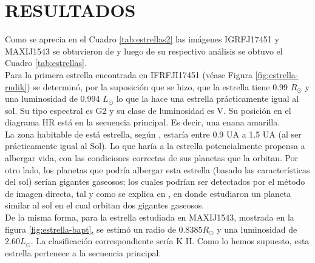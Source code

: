 \section*{RESULTADOS}\label{sec:resultados}

Como se aprecia en el Cuadro \ref{tab:estrellas2} las imágenes IGRFJ17451 y MAXIJ1543 se obtuvieron de \cite{lopez2019quiescent} y luego de su respectivo análisis se obtuvo el Cuadro \ref{tab:estrellas}. \\

Para la primera estrella encontrada en IFRFJI17451 (véase Figura \ref{fig:estrella-rudik}) se determinó, por la suposición que se hizo, que la estrella tiene 0.99 $R_{\odot}$ y una luminosidad de 0.994 $L_{\odot}$ lo que la hace una estrella prácticamente igual al sol. Su tipo espectral es G2 y su clase de luminosidad es V. Su posición en el diagrama HR está en la secuencia principal. Es decir, una enana amarilla. \\

La zona habitable de está estrella, según \cite{lissauer_2020}, estaría entre 0.9 UA a 1.5 UA (al ser prácticamente igual al Sol). Lo que haría a la estrella potencialmente propensa a albergar vida, con las condiciones correctas de sus planetas que la orbitan. Por otro lado, los planetas que podría albergar esta estrella (basado las características del sol) serían gigantes gaseosos; los cuales podrían ser detectados por el método de imagen directa, tal y como se explica en \cite{bohn2020two}, en donde estudiaron un planeta similar al sol en el cual orbitan dos gigantes gaseosos.  \\

De la misma forma, para la estrella estudiada en MAXIJ1543, mostrada en la figura \ref{fig:estrella-bapt}, se estimó un radio de $0.8385 R_\odot$ y una luminosidad de $2.60 L_\odot$. La clasificación correspondiente sería K II. Como lo hemos supuesto, esta estrella pertenece a la secuencia principal. \\


